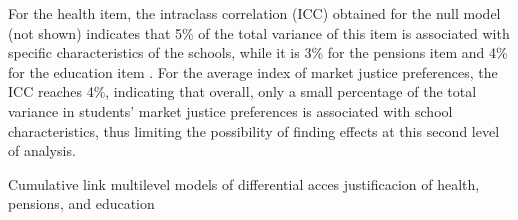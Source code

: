 \documentclass[
    behavsci,
    article,
    submit,
moreauthors
]{mdpi}
\begin{document}
For the health item, the intraclass correlation (ICC) obtained for the
null model (not shown) indicates that 5\% of the total variance of this
item is associated with specific characteristics of the schools, while
it is 3\% for the pensions item and 4\% for the education item
\citep[ICC based on][p.15]{hox_multilevel_2010}. For the average index
of market justice preferences, the ICC reaches 4\%, indicating that
overall, only a small percentage of the total variance in students'
market justice preferences is associated with school characteristics,
thus limiting the possibility of finding effects at this second level of
analysis.

\begin{table}

\caption{\label{tbl-ordinal-reg}Cumulative link multilevel models of
differential acces justificacion of health, pensions, and education}

\centering{

}
\end{table}
\end{document}
